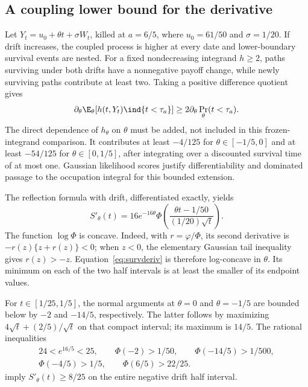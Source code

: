 \subsection{A coupling lower bound for the derivative}
Let $Y_t=u_0+\theta t+\sigma W_t$, killed at $a=6/5$, where $u_0=61/50$ and $\sigma=1/20$. If drift increases, the coupled process is higher at every date and lower-boundary survival events are nested. For a fixed nondecreasing integrand $h\ge2$, paths surviving under both drifts have a nonnegative payoff change, while newly surviving paths contribute at least two. Taking a positive difference quotient gives
\begin{equation}
 \partial_\theta\E_\theta[h(t,Y_t)\ind\{t<\tau_a\}]
 \ge2\partial_\theta\Pr_\theta(t<\tau_a).
\end{equation}
The direct dependence of $h_\theta$ on $\theta$ must be added, not included in this frozen-integrand comparison. It contributes at least $-4/125$ for $\theta\in[-1/5,0]$ and at least $-54/125$ for $\theta\in[0,1/5]$, after integrating over a discounted survival time of at most one. Gaussian likelihood scores justify differentiability and dominated passage to the occupation integral for this bounded extension.

The reflection formula with drift, differentiated exactly, yields
\begin{equation}\label{eq:survderiv}
 S'_\theta(t)=16e^{-16\theta}\Phi\left(\frac{\theta t-1/50}{(1/20)\sqrt t}\right).
\end{equation}
The function $\log\Phi$ is concave. Indeed, with $r=\varphi/\Phi$, its second derivative is $-r(z)\{z+r(z)\}<0$; when $z<0$, the elementary Gaussian tail inequality gives $r(z)>-z$. Equation~\eqref{eq:survderiv} is therefore log-concave in $\theta$. Its minimum on each of the two half intervals is at least the smaller of its endpoint values.

For $t\in[1/25,1/5]$, the normal arguments at $\theta=0$ and $\theta=-1/5$ are bounded below by $-2$ and $-14/5$, respectively. The latter follows by maximizing $4\sqrt t+(2/5)/\sqrt t$ on that compact interval; its maximum is $14/5$. The rational inequalities
\begin{gather}\label{eq:normalbounds}
 24<e^{16/5}<25,\qquad \Phi(-2)>1/50,\qquad \Phi(-14/5)>1/500,\\
 \Phi(-4/5)>1/5,\qquad \Phi(6/5)>22/25.\nonumber
\end{gather}
imply $S'_\theta(t)\ge8/25$ on the entire negative drift half interval.


